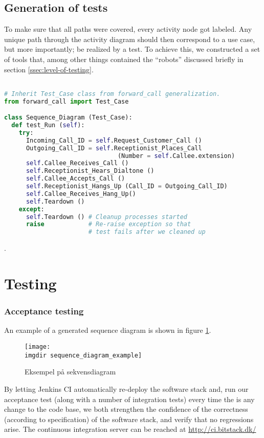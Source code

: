 \subsection{Generation of tests}
To make sure that all paths were covered, every activity node got labeled. Any unique path through the activity diagram should then correspond to a use case, but more importantly; be realized by a test. To achieve this, we constructed a set of tools that, among other things contained the ``robots'' discussed briefly in section \ref{ssec:level-of-testing}.

\begin{lstlisting}[language=Python, caption=Example of a generated test, label=fig:python_test]

# Inherit Test_Case class from forward_call generalization.
from forward_call import Test_Case

class Sequence_Diagram (Test_Case):
  def test_Run (self):
    try:
      Incoming_Call_ID = self.Request_Customer_Call ()
      Outgoing_Call_ID = self.Receptionist_Places_Call 
                               (Number = self.Callee.extension)
      self.Callee_Receives_Call ()
      self.Receptionist_Hears_Dialtone ()
      self.Callee_Accepts_Call ()
      self.Receptionist_Hangs_Up (Call_ID = Outgoing_Call_ID)
      self.Callee_Receives_Hang_Up()
      self.Teardown ()
    except:
      self.Teardown () # Cleanup processes started
      raise            # Re-raise exception so that 
                       # test fails after we cleaned up
\end{lstlisting}

.

\section{Testing}

\subsubsection{Acceptance testing}
An example of a generated sequence diagram is shown in figure \ref{fig:sequence_diagram_example}.
\begin{figure}[ht]
\centering
\texttt{[image: \\imgdir sequence\_diagram\_example]}
\caption{Eksempel på sekvensdiagram}
\label{fig:sequence_diagram_example}
\end{figure}
By letting Jenkins CI automatically re-deploy the software stack and, run our acceptance test (along with a number of integration tests) every time the is any change to the code base, we both strengthen the confidence of the correctness (according to specification) of the software stack, and verify that no regressions arise. The continuous integration server can be reached at \url{http://ci.bitstack.dk/}


